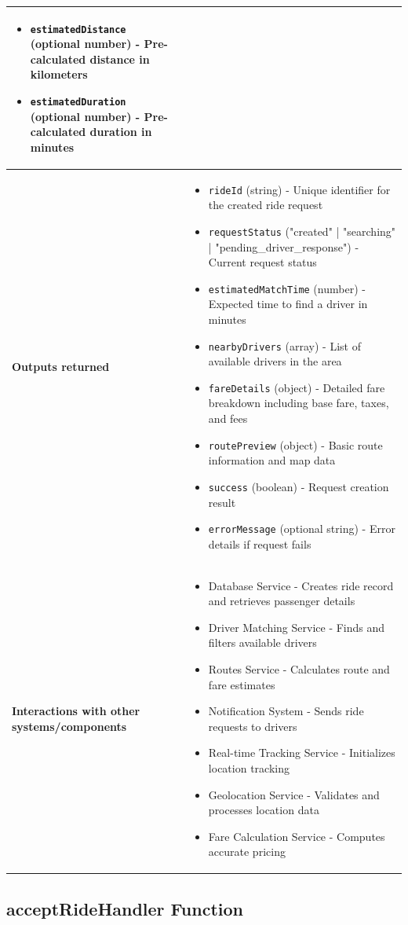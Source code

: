 \documentclass[11pt,a4paper]{article}
\begin{document}
\begin{longtable}{|p{4cm}|p{12cm}|}
\begin{itemize}[nosep]
\item \texttt{estimatedDistance} (optional number) - Pre-calculated distance in kilometers
\item \texttt{estimatedDuration} (optional number) - Pre-calculated duration in minutes
\end{itemize} \\
\hline
\textbf{Outputs returned} & 
\begin{itemize}[nosep]
\item \texttt{rideId} (string) - Unique identifier for the created ride request
\item \texttt{requestStatus} ("created" | "searching" | "pending\_driver\_response") - Current request status
\item \texttt{estimatedMatchTime} (number) - Expected time to find a driver in minutes
\item \texttt{nearbyDrivers} (array) - List of available drivers in the area
\item \texttt{fareDetails} (object) - Detailed fare breakdown including base fare, taxes, and fees
\item \texttt{routePreview} (object) - Basic route information and map data
\item \texttt{success} (boolean) - Request creation result
\item \texttt{errorMessage} (optional string) - Error details if request fails
\end{itemize} \\
\hline
\textbf{Interactions with other systems/components} & 
\begin{itemize}[nosep]
\item Database Service - Creates ride record and retrieves passenger details
\item Driver Matching Service - Finds and filters available drivers
\item Routes Service - Calculates route and fare estimates
\item Notification System - Sends ride requests to drivers
\item Real-time Tracking Service - Initializes location tracking
\item Geolocation Service - Validates and processes location data
\item Fare Calculation Service - Computes accurate pricing
\end{itemize} \\
\hline
\end{longtable}

\subsection{acceptRideHandler Function}
\end{document}
